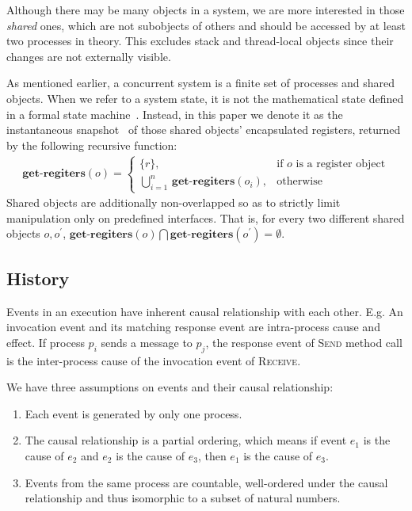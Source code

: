 \documentclass[a4paper,USenglish]{lipics-v2016}
\newcommand{\getreg}{\textbf{get-regiters}}
\begin{document}
Although there may be many objects in a system, we are more interested in those \textit{shared} ones,
which are not subobjects of others and should be accessed by at least two processes in theory.
This excludes stack and thread-local objects since their changes are not externally visible.

As mentioned earlier, a concurrent system is a finite set of processes and shared objects.
When we refer to a system state,
it is not the mathematical state defined in a formal state machine~\cite{Baier08}.
Instead, in this paper we denote it as the instantaneous snapshot~\cite{Afek:1993:ASS:153724.153741} of those shared objects' encapsulated registers,
returned by the following recursive function:
\begin{align*}
{\getreg}(o) = 
	\begin{cases}
		\{r\}, & \mbox{if } o \text{ is a register object} \\
		\displaystyle{\bigcup_{i=1}^{n}} \, {\getreg}(o_i), & \mbox{otherwise}
	\end{cases}
\end{align*}
Shared objects are additionally non-overlapped
so as to strictly limit manipulation only on predefined interfaces.
That is, for every two different shared objects $o, o^\prime$, ${\getreg}(o) \bigcap {\getreg}(o^\prime) = \emptyset$.

\subsection{History}\label{sec:history}

Events in an execution have inherent causal relationship with each other.
E.g. An invocation event and its matching response event are intra-process cause and effect.
If process $p_i$ sends a message to $p_j$, the response event of \textsc{Send} method call is the inter-process cause of the invocation event of \textsc{Receive}.

We have three assumptions on events and their causal relationship:
\begin{enumerate}[(1)]
	\item
	Each event is generated by only one process.
	\item
	The causal relationship is a partial ordering,
	which means if event $e_1$ is the cause of $e_2$ and $e_2$ is the cause of $e_3$, then $e_1$ is the cause of $e_3$.
	\item
	Events from the same process are countable, well-ordered under the causal relationship and thus isomorphic to a subset of natural numbers.
\end{enumerate}
\end{document}
